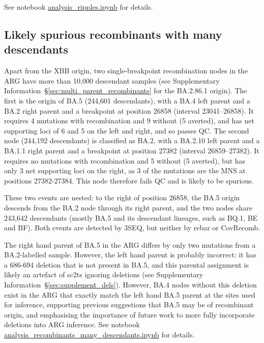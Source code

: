 \documentclass[12pt]{article}
\newcommand{\supref}[1]{Supplementary Information~\S\ref{#1}}
\begin{document}
See notebook
\href{https://github.com/jeromekelleher/sc2ts-paper/blob/main/notebooks/analysis\_ripples.ipynb}
{analysis\_ripples.ipynb}
for details.

\subsection{Likely spurious recombinants with many descendants}
\label{sec:spurious-ancestrally-important-recombinants}
Apart from the XBB origin, two single-breakpoint recombination nodes in the
ARG have more than 10,000 descendant samples
(see \supref{sec:multi_parent_recombinants} for the BA.2.86.1 origin).
The first is the origin of BA.5 (244,601 descendants),
with a BA.4 left parent and a BA.2 right parent and a breakpoint at
position 26858 (interval 23041--26858).
It requires 4 mutations with recombination and 9 without (5 averted),
and has net supporting loci of 6 and 5 on the left and right, and so passes QC.
The second node (244,192 descendants) is classified as BA.2,
with a BA.2.10 left parent and a BA.1.1 right parent and a breakpoint
at position 27382 (interval 26859--27382).
It requires no mutations with recombination and 5 without (5 averted),
but has only 3 net supporting loci on the right, as 3 of the mutations are the
MNS at positions 27382-27384. This node therefore fails QC and
is likely to be spurious.

These two events are nested: to the right of position 26858,
the BA.5 origin descends from the BA.2 node through its right parent,
and the two nodes share 243,642 descendants
(mostly BA.5 and its descendant lineages, such as BQ.1, BE and BF).
Both events are detected by 3SEQ, but neither by rebar or CovRecomb.

The right hand parent of BA.5 in the ARG differs by only two mutations from a
BA.2-labelled sample. However, the left hand parent is probably incorrect: it
has a 686-694 deletion that is not present in BA.5, and this parental assignment
is likely an artefact of sc2ts ignoring deletions (see \supref{sec:supplement_dels}).
However, BA.4 nodes without this deletion exist in the ARG that exactly match
the left hand BA.5 parent at the sites used for inference, supporting
previous suggestions that BA.5 may be of recombinant origin\cite{Tegally2022},
and emphasising the importance of future work to more fully incorporate deletions into
ARG inference.
See notebook
\href{https://github.com/jeromekelleher/sc2ts-paper/blob/main/notebooks/analysis\_recombinants\_many\_descendants.ipynb}
{analysis\_recombinants\_many\_descendants.ipynb} for details.
\end{document}
